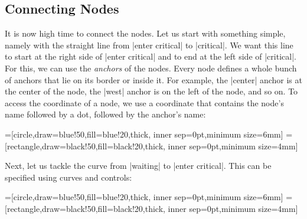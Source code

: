


\subsection{Connecting Nodes}

It is now high time to connect the nodes. Let us start with something
simple, namely with the straight line from |enter critical| to
|critical|. We want this line to start at the right side of
|enter critical| and to end at the left side of |critical|. For
this, we can use the \emph{anchors} of the nodes. Every node defines a
whole bunch of anchors that lie on its border or inside it. For
example, the |center| anchor is at the center of the node, the |west|
anchor is on the left of the node, and so on. To access the coordinate
of a node, we use a coordinate that contains the node's name followed
by a dot, followed by the anchor's name:

{
=[circle,draw=blue!50,fill=blue!20,thick,
                   inner sep=0pt,minimum size=6mm]
=[rectangle,draw=black!50,fill=black!20,thick,
                        inner sep=0pt,minimum size=4mm]
\begin{codeexample}[]
\end{codeexample}
}

Next, let us tackle the curve from |waiting| to |enter critical|. This
can be specified using curves and controls:

{
=[circle,draw=blue!50,fill=blue!20,thick,
                   inner sep=0pt,minimum size=6mm]
=[rectangle,draw=black!50,fill=black!20,thick,
                        inner sep=0pt,minimum size=4mm]
\begin{codeexample}[]
\end{codeexample}
}

